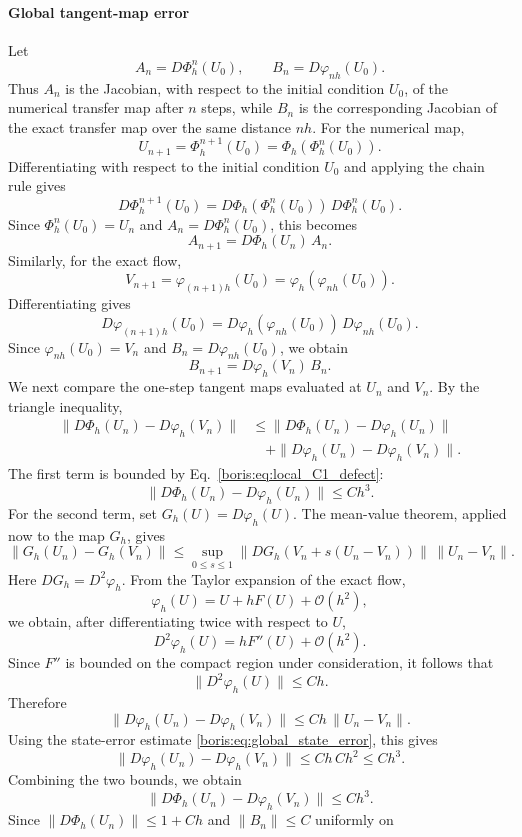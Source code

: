 \paragraph{Global tangent-map error}
Let
\[
A_n = D\Phi_h^n(U_0),\qquad B_n = D\varphi_{nh}(U_0).
\]
Thus \(A_n\) is the Jacobian, with respect to the initial condition \(U_0\),
of the numerical transfer map after \(n\) steps, while \(B_n\) is the
corresponding Jacobian of the exact transfer map over the same distance
\(nh\).
For the numerical map,
\[
U_{n+1}
=
\Phi_h^{n+1}(U_0)
=
\Phi_h\!\left(\Phi_h^n(U_0)\right).
\]
Differentiating with respect to the initial condition \(U_0\) and applying the
chain rule gives
\[
D\Phi_h^{n+1}(U_0)
=
D\Phi_h\!\left(\Phi_h^n(U_0)\right)\,D\Phi_h^n(U_0).
\]
Since \(\Phi_h^n(U_0)=U_n\) and \(A_n=D\Phi_h^n(U_0)\), this becomes
\[
A_{n+1}=D\Phi_h(U_n)\,A_n.
\]
Similarly, for the exact flow,
\[
V_{n+1}
=
\varphi_{(n+1)h}(U_0)
=
\varphi_h\!\left(\varphi_{nh}(U_0)\right).
\]
Differentiating gives
\[
D\varphi_{(n+1)h}(U_0)
=
D\varphi_h\!\left(\varphi_{nh}(U_0)\right)\,D\varphi_{nh}(U_0).
\]
Since \(\varphi_{nh}(U_0)=V_n\) and \(B_n=D\varphi_{nh}(U_0)\), we obtain
\[
B_{n+1}=D\varphi_h(V_n)\,B_n.
\]
We next compare the one-step tangent maps evaluated at \(U_n\) and \(V_n\).
By the triangle inequality,
\[
\begin{aligned}
\|D\Phi_h(U_n)-D\varphi_h(V_n)\|
&\le
\|D\Phi_h(U_n)-D\varphi_h(U_n)\| \\
&\quad
+\|D\varphi_h(U_n)-D\varphi_h(V_n)\|.
\end{aligned}
\]
The first term is bounded by Eq.~\eqref{boris:eq:local_C1_defect}:
\[
\|D\Phi_h(U_n)-D\varphi_h(U_n)\|\le Ch^3.
\]
For the second term, set \(G_h(U)=D\varphi_h(U)\).  The mean-value theorem,
applied now to the map \(G_h\), gives
\[
\|G_h(U_n)-G_h(V_n)\|
\le
\sup_{0\le s\le 1}
\|DG_h(V_n+s(U_n-V_n))\|\,\|U_n-V_n\|.
\]
Here \(DG_h=D^2\varphi_h\).  From the Taylor expansion of the exact flow,
\[
\varphi_h(U)=U+hF(U)+\mathcal O(h^2),
\]
we obtain, after differentiating twice with respect to \(U\),
\[
D^2\varphi_h(U)=hF''(U)+\mathcal O(h^2).
\]
Since \(F''\) is bounded on the compact region under consideration, it follows
that
\[
\|D^2\varphi_h(U)\|\le Ch .
\]
Therefore
\[
\|D\varphi_h(U_n)-D\varphi_h(V_n)\|
\le
Ch\,\|U_n-V_n\|.
\]
Using the state-error estimate \eqref{boris:eq:global_state_error}, this gives
\[
\|D\varphi_h(U_n)-D\varphi_h(V_n)\|
\le
Ch\,Ch^2
\le
Ch^3.
\]
Combining the two bounds, we obtain
\[
\|D\Phi_h(U_n)-D\varphi_h(V_n)\|\le Ch^3.
\]
Since \(\|D\Phi_h(U_n)\|\le 1+Ch\) and \(\|B_n\|\le C\) uniformly on
